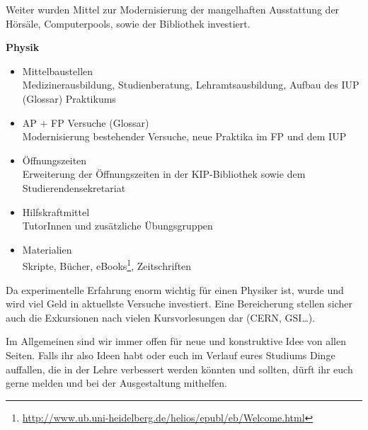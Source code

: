 Weiter wurden Mittel zur Modernisierung der mangelhaften Ausstattung der Hörsäle,
Computerpools, sowie der Bibliothek investiert.

\vspace{5mm}
\textbf{Physik}
\begin{itemize}
\item {Mittelbaustellen}\\Medizinerausbildung, Studienberatung, Lehramtsausbildung, Aufbau des IUP (Glossar) Praktikums
\item {AP + FP Versuche (Glossar)}\\Modernisierung bestehender Versuche, neue
Praktika im FP und dem IUP
\item {Öffnungszeiten}\\Erweiterung der Öffnungszeiten in der \gls{KIP}-Bibliothek sowie dem Studierendensekretariat
\item {Hilfskraftmittel}\\ TutorInnen und zusätzliche Übungsgruppen
\item {Materialien}\\Skripte, Bücher, eBooks\footnote{\url{http://www.ub.uni-heidelberg.de/helios/epubl/eb/Welcome.html}}, Zeitschriften
\end{itemize}

Da experimentelle Erfahrung enorm wichtig für einen Physiker ist, wurde und
wird viel Geld in aktuellste Versuche investiert. Eine Bereicherung stellen
sicher auch die Exkursionen nach vielen Kursvorlesungen dar (CERN, GSI\dots).

Im Allgemeinen sind wir immer offen für neue und konstruktive Idee von allen
Seiten. Falls ihr also Ideen habt oder euch im Verlauf eures Studiums Dinge
auffallen, die in der Lehre verbessert werden könnten und sollten, dürft ihr
euch gerne melden und bei der Ausgestaltung mithelfen.
